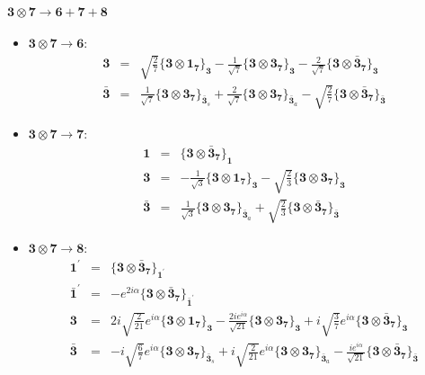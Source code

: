 \documentclass[english]{article}
\newcommand{\subcg}[3]{\big\{ {#1}\otimes{#2}\big\}^{}_{#3}}
\newcommand{\rep}[1]{\mathbf{#1}}
\begin{document}
\paragraph*{\Large $\rep{3}\otimes\rep{7}\to\rep{6}+\rep{7}+\rep{8}$}
\begin{itemize}
\item $\rep{3}\otimes\rep{7}\to\rep{6}$:
\begin{eqnarray*}
\rep{3} &=& \sqrt{\frac{2}{7}}\subcg{\rep{3}}{\rep{1}_{\rep{7}}}{\rep{3}}-\frac{1}{\sqrt{7}}\subcg{\rep{3}}{\rep{3}_{\rep{7}}}{\rep{3}}-\frac{2}{\sqrt{7}}\subcg{\rep{3}}{\rep{\bar{3}}_{\rep{7}}}{\rep{3}}
\\
\rep{\bar{3}} &=& \frac{1}{\sqrt{7}}\subcg{\rep{3}}{\rep{3}_{\rep{7}}}{\rep{\bar{3}}_{s}}+\frac{2}{\sqrt{7}}\subcg{\rep{3}}{\rep{3}_{\rep{7}}}{\rep{\bar{3}}_{a}}-\sqrt{\frac{2}{7}}\subcg{\rep{3}}{\rep{\bar{3}}_{\rep{7}}}{\rep{\bar{3}}}
\end{eqnarray*}
\item $\rep{3}\otimes\rep{7}\to\rep{7}$:
\begin{eqnarray*}
\rep{1} &=& \subcg{\rep{3}}{\rep{\bar{3}}_{\rep{7}}}{\rep{1}}
\\
\rep{3} &=& -\frac{1}{\sqrt{3}}\subcg{\rep{3}}{\rep{1}_{\rep{7}}}{\rep{3}}-\sqrt{\frac{2}{3}}\subcg{\rep{3}}{\rep{3}_{\rep{7}}}{\rep{3}}
\\
\rep{\bar{3}} &=& \frac{1}{\sqrt{3}}\subcg{\rep{3}}{\rep{3}_{\rep{7}}}{\rep{\bar{3}}_{a}}+\sqrt{\frac{2}{3}}\subcg{\rep{3}}{\rep{\bar{3}}_{\rep{7}}}{\rep{\bar{3}}}
\end{eqnarray*}
\item $\rep{3}\otimes\rep{7}\to\rep{8}$:
\begin{eqnarray*}
\rep{1^{\prime}} &=& \subcg{\rep{3}}{\rep{\bar{3}}_{\rep{7}}}{\rep{1^{\prime}}}
\\
\rep{\bar{1}^{\prime}} &=& -e^{2 i \alpha }\subcg{\rep{3}}{\rep{\bar{3}}_{\rep{7}}}{\rep{\bar{1}^{\prime}}}
\\
\rep{3} &=& 2 i \sqrt{\frac{2}{21}} e^{i \alpha }\subcg{\rep{3}}{\rep{1}_{\rep{7}}}{\rep{3}}-\frac{2 i e^{i \alpha }}{\sqrt{21}}\subcg{\rep{3}}{\rep{3}_{\rep{7}}}{\rep{3}}+i \sqrt{\frac{3}{7}} e^{i \alpha }\subcg{\rep{3}}{\rep{\bar{3}}_{\rep{7}}}{\rep{3}}
\\
\rep{\bar{3}} &=& -i \sqrt{\frac{6}{7}} e^{i \alpha }\subcg{\rep{3}}{\rep{3}_{\rep{7}}}{\rep{\bar{3}}_{s}}+i \sqrt{\frac{2}{21}} e^{i \alpha }\subcg{\rep{3}}{\rep{3}_{\rep{7}}}{\rep{\bar{3}}_{a}}-\frac{i e^{i \alpha }}{\sqrt{21}}\subcg{\rep{3}}{\rep{\bar{3}}_{\rep{7}}}{\rep{\bar{3}}}
\end{eqnarray*}
\end{itemize}
\end{document}
